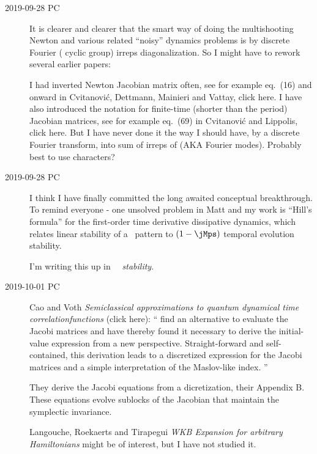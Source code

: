 \begin{description}
\item[2019-09-28 PC]
It is clearer and clearer that the smart way of doing the
multishooting Newton and various related ``noisy'' dynamics problems is
by discrete Fourier ( cyclic group) irreps diagonalization.
So I might have to rework several earlier papers:

I had inverted Newton Jacobian matrix often, see for example
eq.~(16) and onward in Cvitanovi{\'c}, Dettmann, Mainieri and
Vattay,
 {click here}. I
have also introduced the notation for finite-time (shorter than the
period) Jacobian matrices, see for example eq.~(69) in Cvitanovi{\'c} and
Lippolis,
 {click here}.
But I have never done it the way I should have, by a discrete Fourier
transform, into sum of irreps of  (AKA Fourier modes). Probably best
to use characters?

\item[2019-09-28 PC]
I think I have finally committed the long awaited conceptual
breakthrough. To remind everyone - one unsolved problem in Matt and my
work is ``Hill's formula'' for the first-order time
derivative dissipative dynamics, which relates linear stability of a
\spt\ pattern to $(1-\jMps)$ temporal evolution stability.

I'm writing this up in ~{\em \Spt\ stability}.

\item[2019-10-01 PC]
Cao and Voth {\em Semiclassical approximations to quantum
dynamical time correlationfunctions}
{(click here)}: ``
find an alternative to evaluate the Jacobi matrices and have thereby found
it necessary to derive the initial-value expression from a new
perspective. Straight-forward and self-contained, this derivation leads
to a discretized expression for the Jacobi matrices and a simple
interpretation of the Maslov-like index.
''

They derive the Jacobi equations from a dicretization, their Appendix B.
These equations evolve sublocks of the Jacobian that maintain the
symplectic invariance.

Langouche, Roekaerts and Tirapegui
{\em {WKB} Expansion for arbitrary {Hamiltonians}} might be of interest,
but I have not studied it.


\end{description}
